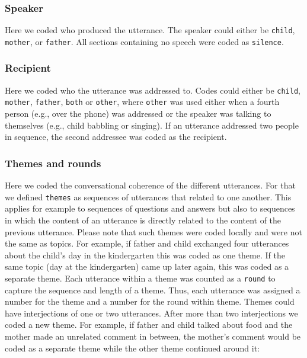 \documentclass[
  man,floatsintext]{apa6}
\begin{document}
\hypertarget{speaker}{%
\subsubsection{Speaker}\label{speaker}}

Here we coded who produced the utterance. The speaker could either be \texttt{child}, \texttt{mother}, or \texttt{father}. All sections containing no speech were coded as \texttt{silence}.

\hypertarget{recipient}{%
\subsubsection{Recipient}\label{recipient}}

Here we coded who the utterance was addressed to. Codes could either be \texttt{child}, \texttt{mother}, \texttt{father}, \texttt{both} or \texttt{other}, where \texttt{other} was used either when a fourth person (e.g., over the phone) was addressed or the speaker was talking to themselves (e.g., child babbling or singing). If an utterance addressed two people in sequence, the second addressee was coded as the recipient.

\hypertarget{themes-and-rounds}{%
\subsubsection{Themes and rounds}\label{themes-and-rounds}}

Here we coded the conversational coherence of the different utterances. For that we defined \texttt{themes} as sequences of utterances that related to one another. This applies for example to sequences of questions and answers but also to sequences in which the content of an utterance is directly related to the content of the previous utterance. Please note that such themes were coded locally and were not the same as topics. For example, if father and child exchanged four utterances about the child's day in the kindergarten this was coded as one theme. If the same topic (day at the kindergarten) came up later again, this was coded as a separate theme. Each utterance within a theme was counted as a \texttt{round} to capture the sequence and length of a theme. Thus, each utterance was assigned a number for the theme and a number for the round within theme. Themes could have interjections of one or two utterances. After more than two interjections we coded a new theme. For example, if father and child talked about food and the mother made an unrelated comment in between, the mother's comment would be coded as a separate theme while the other theme continued around it:
\end{document}
